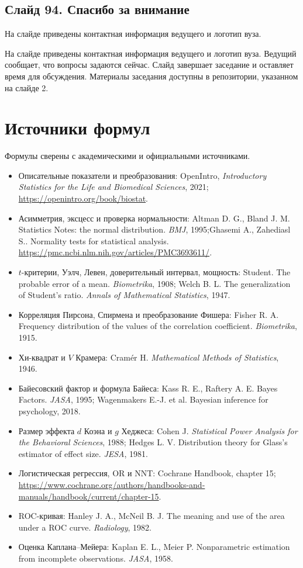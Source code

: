 \documentclass[11pt,a4paper]{article}
\begin{document}
\subsection*{Слайд 94. Спасибо за внимание}
\begin{onslide}
На слайде приведены контактная информация ведущего и логотип вуза.
\end{onslide}
На слайде приведены контактная информация ведущего и логотип вуза. Ведущий сообщает, что вопросы задаются сейчас. Слайд завершает заседание и оставляет время для обсуждения. Материалы заседания доступны в репозитории, указанном на слайде 2.

\section*{Источники формул}

Формулы сверены с академическими и официальными источниками.

\begin{itemize}\footnotesize
\item Описательные показатели и преобразования: OpenIntro, \emph{Introductory Statistics for the Life and Biomedical Sciences}, 2021; \url{https://openintro.org/book/biostat}.
\item Асимметрия, эксцесс и проверка нормальности: Altman D. G., Bland J. M. Statistics Notes: the normal distribution. \emph{BMJ}, 1995;Ghasemi A., Zahediasl S.. Normality tests for statistical analysis. \url{https://pmc.ncbi.nlm.nih.gov/articles/PMC3693611/}.
\item $t$-критерии, Уэлч, Левен, доверительный интервал, мощность: Student. The probable error of a mean. \emph{Biometrika}, 1908; Welch B. L. The generalization of Student's ratio. \emph{Annals of Mathematical Statistics}, 1947.
\item Корреляция Пирсона, Спирмена и преобразование Фишера: Fisher R. A. Frequency distribution of the values of the correlation coefficient. \emph{Biometrika}, 1915.
\item Хи-квадрат и $V$ Крамера: Cramér H. \emph{Mathematical Methods of Statistics}, 1946.
\item Байесовский фактор и формула Байеса: Kass R. E., Raftery A. E. Bayes Factors. \emph{JASA}, 1995; Wagenmakers E.-J. et al. Bayesian inference for psychology, 2018.
\item Размер эффекта $d$ Коэна и $g$ Хеджеса: Cohen J. \emph{Statistical Power Analysis for the Behavioral Sciences}, 1988; Hedges L. V. Distribution theory for Glass's estimator of effect size. \emph{JESA}, 1981.
\item Логистическая регрессия, OR и NNT: Cochrane Handbook, chapter 15; \url{https://www.cochrane.org/authors/handbooks-and-manuals/handbook/current/chapter-15}.
\item ROC-кривая: Hanley J. A., McNeil B. J. The meaning and use of the area under a ROC curve. \emph{Radiology}, 1982.
\item Оценка Каплана--Мейера: Kaplan E. L., Meier P. Nonparametric estimation from incomplete observations. \emph{JASA}, 1958.
\end{itemize}
\end{document}

